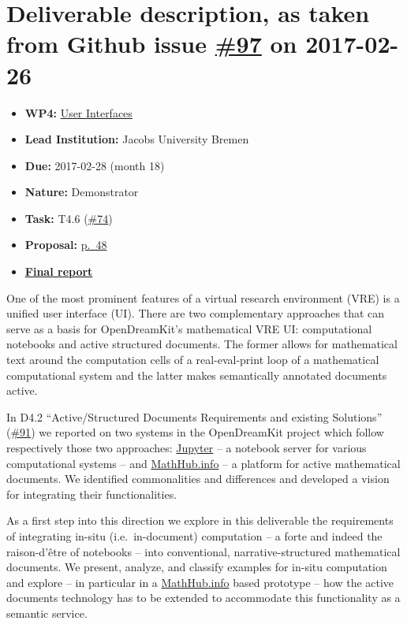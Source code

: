 \section*{\texorpdfstring{Deliverable description, as taken from Github
issue
\href{https://github.com/OpenDreamKit/OpenDreamKit/issues/97}{\#97} on
2017-02-26}{Deliverable description, as taken from Github issue \#97 on 2017-02-26}}\label{deliverable-description-as-taken-from-github-issue-97-on-2017-02-26}

\begin{itemize}
\tightlist
\item
  \textbf{WP4:}
  \href{https://github.com/OpenDreamKit/OpenDreamKit/tree/master/WP4}{User
  Interfaces}
\item
  \textbf{Lead Institution:} Jacobs University Bremen
\item
  \textbf{Due:} 2017-02-28 (month 18)
\item
  \textbf{Nature:} Demonstrator
\item
  \textbf{Task:} T4.6
  (\href{https://github.com/OpenDreamKit/OpenDreamKit/issues/74}{\#74})
\item
  \textbf{Proposal:}
  \href{https://github.com/OpenDreamKit/OpenDreamKit/raw/master/Proposal/proposal-www.pdf}{p.~48}
\item
  \textbf{\href{https://github.com/OpenDreamKit/OpenDreamKit/raw/master/WP4/D4.9/report-final.pdf}{Final
  report}}
\end{itemize}

One of the most prominent features of a virtual research environment
(VRE) is a unified user interface (UI). There are two complementary
approaches that can serve as a basis for OpenDreamKit's mathematical VRE
UI: computational notebooks and active structured documents. The former
allows for mathematical text around the computation cells of a
real-eval-print loop of a mathematical computational system and the
latter makes semantically annotated documents active.

In D4.2 ``Active/Structured Documents Requirements and existing
Solutions''
(\href{https://github.com/OpenDreamKit/OpenDreamKit/issues/91}{\#91}) we
reported on two systems in the OpenDreamKit project which follow
respectively those two approaches: \href{http://jupyter.org}{Jupyter} --
a notebook server for various computational systems -- and
\href{http://MathHub.info}{MathHub.info} -- a platform for active
mathematical documents. We identified commonalities and differences and
developed a vision for integrating their functionalities.

As a first step into this direction we explore in this deliverable the
requirements of integrating in-situ (i.e.~in-document) computation -- a
forte and indeed the raison-d'être of notebooks -- into conventional,
narrative-structured mathematical documents. We present, analyze, and
classify examples for in-situ computation and explore -- in particular
in a \href{http://MathHub.info}{MathHub.info} based prototype -- how the
active documents technology has to be extended to accommodate this
functionality as a semantic service.
